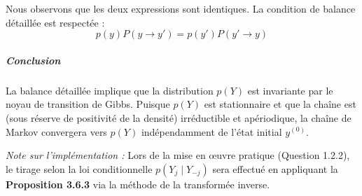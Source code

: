Nous observons que les deux expressions sont identiques. La condition de 
balance détaillée est respectée :
\begin{equation}
    p(y) P(y \to y') = p(y') P(y' \to y)
\end{equation}

\subparagraph{Conclusion}
La balance détaillée implique que la distribution $p(Y)$ est invariante par le noyau 
de transition de Gibbs. Puisque $p(Y)$ est stationnaire et que la chaîne est 
(sous réserve de positivité de la densité) irréductible et apériodique, la chaîne de 
Markov convergera vers $p(Y)$ indépendamment de l'état initial $y^{(0)}$.

\textit{Note sur l'implémentation :} Lors de la mise en œuvre pratique (Question 1.2.2), le tirage selon la loi conditionnelle $p(Y_j \mid Y_{-j})$ sera effectué en appliquant la \textbf{Proposition 3.6.3} via la méthode de la transformée inverse.